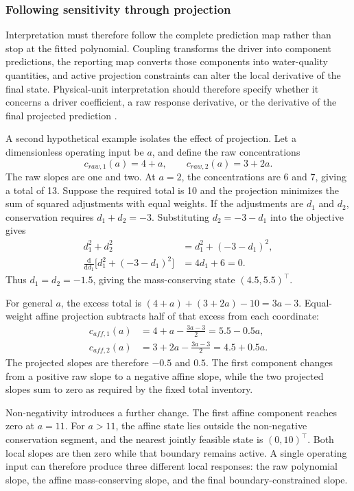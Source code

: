 \subsubsection{Following sensitivity through projection}

Interpretation must therefore follow the complete prediction map rather than stop at the fitted polynomial. Coupling transforms the driver into component predictions, the reporting map converts those components into water-quality quantities, and active projection constraints can alter the local derivative of the final state. Physical-unit interpretation should therefore specify whether it concerns a driver coefficient, a raw response derivative, or the derivative of the final projected prediction \citep{Brunton2016,Shen2023}.

A second hypothetical example isolates the effect of projection. Let a dimensionless operating input be \(a\), and define the raw concentrations
\[
c_{raw,1}(a)=4+a,\qquad c_{raw,2}(a)=3+2a.
\]
The raw slopes are one and two. At \(a=2\), the concentrations are 6 and 7, giving a total of 13. Suppose the required total is 10 and the projection minimizes the sum of squared adjustments with equal weights. If the adjustments are \(d_1\) and \(d_2\), conservation requires \(d_1+d_2=-3\). Substituting \(d_2=-3-d_1\) into the objective gives
\[
\begin{aligned}
d_1^2+d_2^2&=d_1^2+(-3-d_1)^2,\\
\frac{\mathrm d}{\mathrm d d_1}\bigl[d_1^2+(-3-d_1)^2\bigr]
&=4d_1+6=0.
\end{aligned}
\]
Thus \(d_1=d_2=-1.5\), giving the mass-conserving state \((4.5,5.5)^\top\).

For general \(a\), the excess total is \((4+a)+(3+2a)-10=3a-3\). Equal-weight affine projection subtracts half of that excess from each coordinate:
\[
\begin{aligned}
c_{aff,1}(a)&=4+a-\frac{3a-3}{2}=5.5-0.5a,\\
c_{aff,2}(a)&=3+2a-\frac{3a-3}{2}=4.5+0.5a.
\end{aligned}
\]
The projected slopes are therefore \(-0.5\) and \(0.5\). The first component changes from a positive raw slope to a negative affine slope, while the two projected slopes sum to zero as required by the fixed total inventory.

Non-negativity introduces a further change. The first affine component reaches zero at \(a=11\). For \(a>11\), the affine state lies outside the non-negative conservation segment, and the nearest jointly feasible state is \((0,10)^\top\). Both local slopes are then zero while that boundary remains active. A single operating input can therefore produce three different local responses: the raw polynomial slope, the affine mass-conserving slope, and the final boundary-constrained slope.

